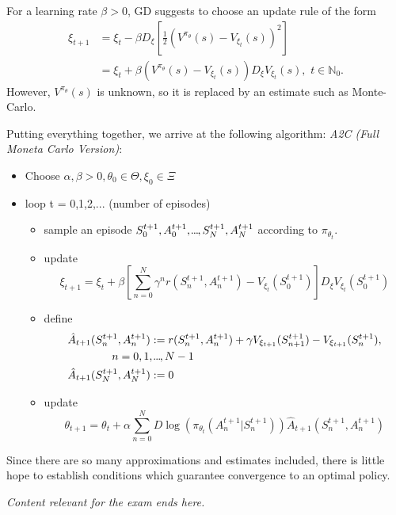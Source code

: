  For a learning rate \( \beta > 0  \), GD suggests to choose an update rule of the form
 \begin{align*}
     \xi_{t+1} &= \xi_{t} - \beta D_{\xi} \left[ \frac{1}{2}(V^{\pi_\theta}(s) - V_{\xi_t}(s))^2 \right] \\
     &= \xi_t + \beta (V^{\pi_\theta}(s) - V_{\xi_t}(s)) D_\xi V_{\xi_{t}}(s), \,\, t \in \mathbb{N}_{0}.
 \end{align*}
 However, \( V^{\pi_\theta}(s) \) is unknown, so it is replaced by an estimate such as Monte-Carlo.



 Putting everything together, we arrive at the following algorithm: \emph{A2C (Full Moneta Carlo Version)}:
 \begin{itemize}
     \item Choose \( \alpha, \beta > 0, \theta_{0} \in \Theta, \xi_{0} \in \Xi\)
     \item loop t = 0,1,2,... (number of episodes)
     \begin{itemize}
         \item sample an episode \( S_{0}^{t+1}, A_{0}^{t+1},\kern-0.10em.\kern-0.06em.\kern-0.06em.\kern-0.1em,S_N^{t+1}, A_N^{t+1} \) according to \( \pi_{\theta_t} \).
         \item update 
         \[
             \xi_{t+1} = \xi_t + \beta \left[ \sum_{n=0}^N \gamma^n r(S_n^{t+1}, A_n^{t+1}) - V_{\xi_t}(S_{0}^{t+1}) \right] D_\xi V_{\xi_t}(S_{0}^{t+1})
         \]  
         \item define 
         \begin{align*}
             &\hat{A}_{t+1}(S_n^{t+1}, A_n^{t+1}) := r(S_n^{t+1}, A_n^{t+1}) + \gamma V_{\xi_{t + 1}}(S_{n+1}^{t+1}) - V_{\xi_{t+1}}(S_n^{t+1}),\\
             & \qquad \qquad n= 0,1,\kern-0.10em.\kern-0.06em.\kern-0.06em.\kern-0.1em,N-1\\
             &\hat{A}_{t+1}(S_N^{t+1}, A_N^{t+1}) := 0
         \end{align*}
         \item update 
         \[
             \theta_{t+1} = \theta_{t} + \alpha \sum_{ n = 0}^N D \log(\pi_{\theta_t}(A_{n}^{t+1} | S_n^{t+1} )) \hat{A}_{t+1}(S_n^{t+1}, A_n^{t+1})
         \]
     \end{itemize} 
 \end{itemize}

Since there are so many approximations and estimates included, there is little hope to establish conditions which guarantee convergence to an optimal policy.

\begin{center}
    \emph{Content relevant for the exam ends here.}
\end{center}
